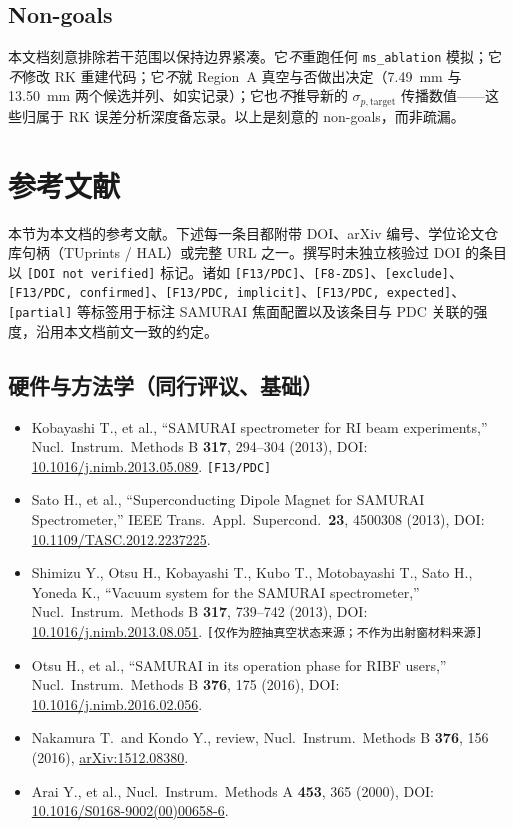 \documentclass[a4paper, 11pt]{article}
\begin{document}
\subsection{Non-goals}
本文档刻意排除若干范围以保持边界紧凑。它\emph{不}重跑任何 \texttt{ms\_ablation} 模拟；它\emph{不}修改 RK 重建代码；它\emph{不}就 Region~A 真空与否做出决定（7.49~mm 与 13.50~mm 两个候选并列、如实记录）；它也\emph{不}推导新的 $\sigma_{p,\text{target}}$ 传播数值——这些归属于 RK 误差分析深度备忘录。以上是刻意的 non-goals，而非疏漏。

\section{参考文献}
本节为本文档的参考文献。下述每一条目都附带 DOI、arXiv 编号、学位论文仓库句柄（TUprints / HAL）或完整 URL 之一。撰写时未独立核验过 DOI 的条目以 \texttt{[DOI not verified]} 标记。诸如 \texttt{[F13/PDC]}、\texttt{[F8-ZDS]}、\texttt{[exclude]}、\texttt{[F13/PDC, confirmed]}、\texttt{[F13/PDC, implicit]}、\texttt{[F13/PDC, expected]}、\texttt{[partial]} 等标签用于标注 SAMURAI 焦面配置以及该条目与 PDC 关联的强度，沿用本文档前文一致的约定。

\subsection{硬件与方法学（同行评议、基础）}
\begin{itemize}
  \item Kobayashi T., et al., ``SAMURAI spectrometer for RI beam experiments,'' Nucl.\ Instrum.\ Methods B \textbf{317}, 294--304 (2013), DOI: \href{https://doi.org/10.1016/j.nimb.2013.05.089}{10.1016/j.nimb.2013.05.089}. \texttt{[F13/PDC]}
  \item Sato H., et al., ``Superconducting Dipole Magnet for SAMURAI Spectrometer,'' IEEE Trans.\ Appl.\ Supercond.\ \textbf{23}, 4500308 (2013), DOI: \href{https://doi.org/10.1109/TASC.2012.2237225}{10.1109/TASC.2012.2237225}.
  \item Shimizu Y., Otsu H., Kobayashi T., Kubo T., Motobayashi T., Sato H., Yoneda K., ``Vacuum system for the SAMURAI spectrometer,'' Nucl.\ Instrum.\ Methods B \textbf{317}, 739--742 (2013), DOI: \href{https://doi.org/10.1016/j.nimb.2013.08.051}{10.1016/j.nimb.2013.08.051}. \texttt{[仅作为腔抽真空状态来源；不作为出射窗材料来源]}
  \item Otsu H., et al., ``SAMURAI in its operation phase for RIBF users,'' Nucl.\ Instrum.\ Methods B \textbf{376}, 175 (2016), DOI: \href{https://doi.org/10.1016/j.nimb.2016.02.056}{10.1016/j.nimb.2016.02.056}.
  \item Nakamura T.\ and Kondo Y., review, Nucl.\ Instrum.\ Methods B \textbf{376}, 156 (2016), \href{https://arxiv.org/abs/1512.08380}{arXiv:1512.08380}.
  \item Arai Y., et al., Nucl.\ Instrum.\ Methods A \textbf{453}, 365 (2000), DOI: \href{https://doi.org/10.1016/S0168-9002(00)00658-6}{10.1016/S0168-9002(00)00658-6}.
\end{itemize}
\end{document}
